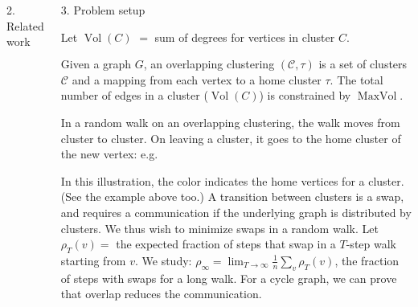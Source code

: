 \documentclass[final,hyperref={pdfpagelabels=true},t]{beamer}
\DeclareMathOperator{\maxvol}{MaxVol}
\DeclareMathOperator{\vol}{Vol}
\renewcommand{\emph}[1]{\textcolor{accentlight}{#1}}
\begin{document}
\begin{frame}
\begin{columns}
\begin{block}{2. Related work}
\end{block}

 
\vspace{0.5\pageborder} 
\begin{block}{3. Problem setup}
\RaggedRight

{{\large {}}}
Let \alert{$\vol(C)$} $ = $ sum of degrees for vertices in cluster $C$.

\begin{highlight}
Given a graph $G$, an \alert{overlapping 
clustering $(\mathcal{C},\tau)$} is a set
of clusters $\mathcal{C}$ and a mapping from each vertex 
to a home cluster $\tau$.  The total number of edges in a
cluster ($\vol(C)$) is constrained by \alert{$\maxvol$}.  
\end{highlight}

In a random walk on an
overlapping clustering, the walk moves from cluster to
cluster.  On leaving a cluster, it goes to the
home cluster of the new vertex: e.g.
In this illustration, the color indicates
the home vertices for a cluster.  (See the example
above too.)
\emph{A transition between clusters is a swap, and requires a 
communication if the underlying graph is distributed by 
clusters}.  
We thus wish to minimize
swaps in a random walk.  Let $\rho_T(v) = $
the expected fraction of steps that swap in a $T$-step 
walk starting from $v$.  We study:
\alert{$\rho_\infty = \lim_{T \to \infty} \frac{1}{n} \sum_{v} \rho_T(v)$},
the fraction of steps with swaps for a long walk.
\emph{For a cycle graph, we can prove that overlap reduces
the communication.}




\end{block}
\end{columns}
\end{frame}
\end{document}
